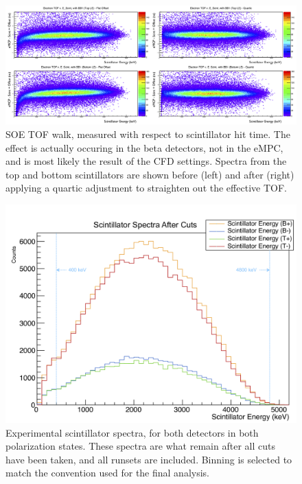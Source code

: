 \begin{figure}[h!!tb]
	\centering
	\includegraphics[width=.999\linewidth]
	{Figures/WalkAdjust.png}
	\caption[SOE TOF Walk and Correction]{SOE TOF walk, measured with respect to scintillator hit time.  The effect is actually occuring in the beta detectors, not in the eMPC, and is most likely the result of the \ac{CFD} settings.  Spectra from the top and bottom scintillators are shown before (left) and after (right) applying a quartic adjustment to straighten out the effective TOF.}	
	\label{fig:WalkAdjust}
\end{figure}


\begin{figure}[h!!tb]
	\centering
	\includegraphics[width=.999\linewidth]
	{Figures/experimental_scintspectra_lin.png}
	\caption[Experimental Scintillator Spectra]{Experimental scintillator spectra, for both detectors in both polarization states.  These spectra are what remain after all cuts have been taken, and all runsets are included.  Binning is selected to match the convention used for the final analysis.}	
	\label{fig:scintspectra}
\end{figure}


